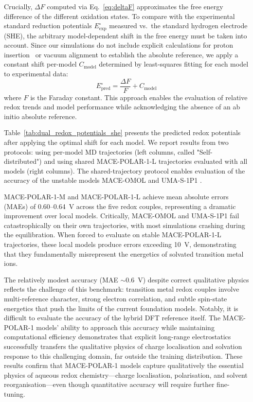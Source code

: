 \documentclass[aps,%
superscriptaddress,
 amsmath,amssymb,
floatfix,
twocolumn
]{revtex4-2}
\newcommand{\MOMOL}{MACE-OMOL }
\newcommand{\MFP}{MACE-POLAR-1 }
\newcommand{\MFPM}{MACE-POLAR-1-M }
\newcommand{\MFPL}{MACE-POLAR-1-L }
\newcommand{\UMAS}{UMA-S-1P1 }
\begin{document}
Crucially, $\Delta F$ computed via Eq.~\ref{eq:deltaF} approximates the free energy difference of the different oxidation states. To compare with the experimental standard reduction potentials $E^{\circ}_{\text{exp}}$ measured vs.\ the standard hydrogen electrode (SHE), the arbitrary model-dependent shift in the free energy must be taken into account. Since our simulations do not include explicit calculations for proton insertion~\cite{Blumberger2005} or vacuum alignment to establish the absolute reference, we apply a constant shift per-model $C_{\text{model}}$ determined by least-squares fitting for each model to experimental data:
\begin{equation}
E^{\circ}_{\text{pred}} = \frac{\Delta F}{F} + C_{\text{model}}
\end{equation}
where $F$ is the Faraday constant. This approach enables the evaluation of relative redox trends and model performance while acknowledging the absence of an ab initio absolute reference.

Table~\ref{tab:dual_redox_potentials_she} presents the predicted redox potentials after applying the optimal shift for each model. We report results from two protocols: using per-model MD trajectories (left columns, called "Self-distributed") and using shared \MFPL trajectories evaluated with all models (right columns). The shared-trajectory protocol enables evaluation of the accuracy of the unstable models \MOMOL and \UMAS.

\MFPM and \MFPL achieve mean absolute errors (MAEs) of 0.60--0.64~V across the five redox couples, representing a dramatic improvement over local models. Critically, \MOMOL and \UMAS fail catastrophically on their own trajectories, with most simulations crashing during the equilibration. When forced to evaluate on stable \MFPL trajectories, these local models produce errors exceeding 10~V, demonstrating that they fundamentally misrepresent the energetics of solvated transition metal ions.

The relatively modest accuracy (MAE $\sim$0.6~V) despite correct qualitative physics reflects the challenge of this benchmark: transition metal redox couples involve multi-reference character, strong electron correlation, and subtle spin-state energetics that push the limits of the current foundation models. Notably, it is difficult to evaluate the accuracy of the hybrid DFT reference itself. The \MFP models' ability to approach this accuracy while maintaining computational efficiency demonstrates that explicit long-range electrostatics successfully transfers the qualitative physics of charge localisation and solvation response to this challenging domain, far outside the training distribution. These results confirm that \MFP models capture qualitatively the essential physics of aqueous redox chemistry—charge localisation, polarisation, and solvent reorganisation—even though quantitative accuracy will require further fine-tuning.
\end{document}
